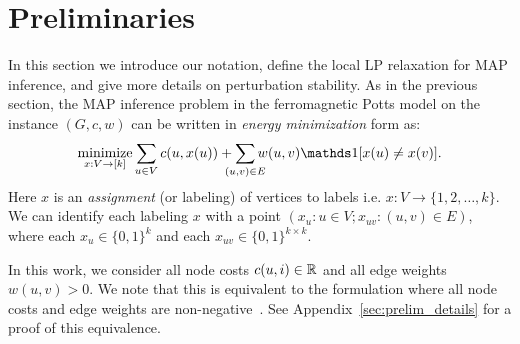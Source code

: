 \section{Preliminaries}
\label{sec:prelim}
In this section we introduce our notation, define the local LP relaxation for MAP inference, and give more details on perturbation stability.
As in the previous section, the MAP inference problem in the ferromagnetic Potts model on the instance $(G,c,w)$ can be written in \emph{energy minimization} form as:
\begin{equation}
\label{eqn:map-problem}
  \minimize_{x: V\to [k]}\sum_{u\in V}c(u, x(u)) + \smashoperator{\sum_{(u,v) \in E}}w(u,v)\indicator[x(u) \ne x(v)].
\end{equation}
Here $x$ is an \emph{assignment} (or labeling) of vertices to labels i.e. $x: V\to \{1,2,\dots,k\}$. We can identify each labeling $x$ with a point $(x_u : u\in V; x_{uv} : (u,v) \in E)$, where each $x_u \in \{0,1\}^k$ and each $x_{uv} \in \{0,1\}^{k\times k}$. 

In this work, we consider all node costs $c(u,i) \in \mathbb{R}$ and all edge weights $w(u,v) > 0$. We note that this is equivalent to the formulation where all node costs and edge weights are non-negative~\cite{KleinbergTardos02}. See Appendix~\ref{sec:prelim_details} for a proof of this equivalence. 

